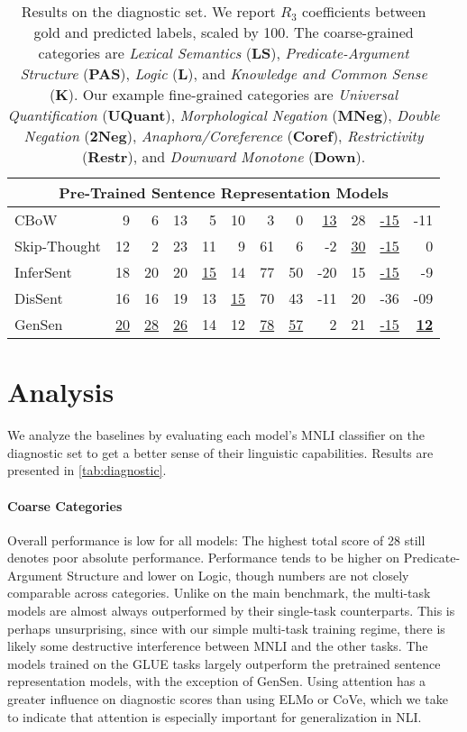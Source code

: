 \begin{table*}[t]
\begin{tabular}{lr@{\hskip 3em}rrrr@{\hskip 3em}rrrrrr}
\midrule
\multicolumn{12}{c}{Pre-Trained Sentence Representation Models} \\
\midrule
CBoW & 9 & 6 & 13 & 5 & 10 & 3 & 0 & \underline{13} & 28 & \underline{-15} & -11 \\
Skip-Thought & 12 & 2 & 23 & 11 & 9 & 61 & 6 & -2 & \underline{30} & \underline{-15} & 0 \\
InferSent & 18 & 20 & 20 & \underline{15} & 14 & 77 & 50 & -20 & 15 & \underline{-15} & -9 \\
DisSent & 16 & 16 & 19 & 13 & \underline{15} & 70 & 43 & -11 & 20 & -36 & -09 \\
GenSen & \underline{20} & \underline{28} & \underline{26} & 14 & 12 & \underline{78} & \underline{57} & 2 & 21 & \underline{-15} & \textbf{\underline{12}} \\
\bottomrule
\end{tabular}
\caption{Results on the diagnostic set. We report \(R_3\) coefficients between gold and predicted labels, scaled by 100.
The coarse-grained categories are \textit{Lexical Semantics} (\textbf{LS}),
\textit{Predicate-Argument Structure} (\textbf{PAS}),
\textit{Logic} (\textbf{L}),
and \textit{Knowledge and Common Sense} (\textbf{K}). Our example fine-grained categories are \textit{Universal Quantification} (\textbf{UQuant}),
\textit{Morphological Negation} (\textbf{MNeg}),
\textit{Double Negation} (\textbf{2Neg}),
\textit{Anaphora/Coreference} (\textbf{Coref}), \textit{Restrictivity} (\textbf{Restr}), and \textit{Downward Monotone} (\textbf{Down}).}
\label{tab:diagnostic}
\end{table*}

\section{Analysis}

We analyze the baselines by evaluating each model's MNLI classifier on the diagnostic set to get a better sense of their linguistic capabilities.
Results are presented in \autoref{tab:diagnostic}.

\paragraph{Coarse Categories}
Overall performance is low for all models: The highest total score of 28 still denotes poor absolute performance.
Performance tends to be higher on Predicate-Argument Structure and lower on Logic, though numbers are not closely comparable across categories.
Unlike on the main benchmark, the multi-task models are almost always outperformed by their single-task counterparts.
This is perhaps unsurprising, since with our simple multi-task training regime, there is likely some destructive interference between MNLI and the other tasks.
The models trained on the GLUE tasks largely outperform the pretrained sentence representation models, with the exception of GenSen.
Using attention has a greater influence on diagnostic scores than using ELMo or CoVe, which we take to indicate that attention is especially important for generalization in NLI.

